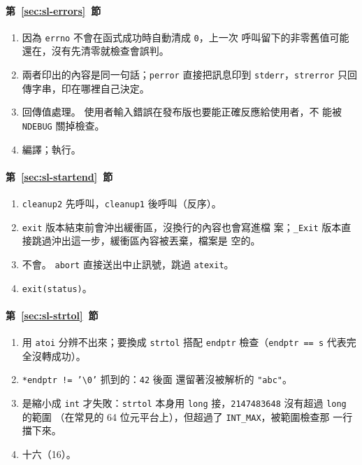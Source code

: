 \paragraph{第~\ref{sec:sl-errors}~節}
\begin{enumerate}
\item 因為 \texttt{errno} 不會在函式成功時自動清成 \texttt{0}，上一次
呼叫留下的非零舊值可能還在，沒有先清零就檢查會誤判。
\item 兩者印出的內容是同一句話；\texttt{perror} 直接把訊息印到
\texttt{stderr}，\texttt{strerror} 只回傳字串，印在哪裡自己決定。
\item 回傳值處理。 使用者輸入錯誤在發布版也要能正確反應給使用者，不
能被 \texttt{NDEBUG} 關掉檢查。
\item 編譯；執行。
\end{enumerate}

\paragraph{第~\ref{sec:sl-startend}~節}
\begin{enumerate}
\item \texttt{cleanup2} 先呼叫，\texttt{cleanup1} 後呼叫（反序）。
\item \texttt{exit} 版本結束前會沖出緩衝區，沒換行的內容也會寫進檔
案；\texttt{\_Exit} 版本直接跳過沖出這一步，緩衝區內容被丟棄，檔案是
空的。
\item 不會。 \texttt{abort} 直接送出中止訊號，跳過 \texttt{atexit}。
\item \texttt{exit(status)}。
\end{enumerate}

\paragraph{第~\ref{sec:sl-strtol}~節}
\begin{enumerate}
\item 用 \texttt{atoi} 分辨不出來；要換成 \texttt{strtol} 搭配
\texttt{endptr} 檢查（\texttt{endptr == s} 代表完全沒轉成功）。
\item \texttt{*endptr != '\textbackslash 0'} 抓到的：\texttt{42} 後面
還留著沒被解析的 \texttt{"abc"}。
\item 是縮小成 \texttt{int} 才失敗：\texttt{strtol} 本身用
\texttt{long} 接，\texttt{2147483648} 沒有超過 \texttt{long} 的範圍
（在常見的 64 位元平台上），但超過了 \texttt{INT\_MAX}，被範圍檢查那
一行擋下來。
\item 十六（16）。
\end{enumerate}

